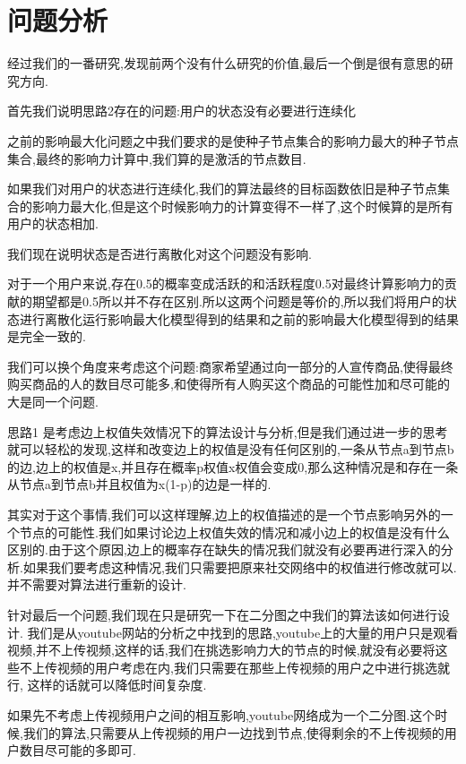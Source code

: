 \documentclass[11pt, a4paper]{article}
\begin{document}
  \section{问题分析}

  经过我们的一番研究,发现前两个没有什么研究的价值,最后一个倒是很有意思的研究方向.

  首先我们说明思路2存在的问题:用户的状态没有必要进行连续化

  之前的影响最大化问题之中我们要求的是使种子节点集合的影响力最大的种子节点集合,最终的影响力计算中,我们算的是激活的节点数目.

  如果我们对用户的状态进行连续化,我们的算法最终的目标函数依旧是种子节点集合的影响力最大化,但是这个时候影响力的计算变得不一样了,这个时候算的是所有用户的状态相加.

  我们现在说明状态是否进行离散化对这个问题没有影响.

  对于一个用户来说,存在0.5的概率变成活跃的和活跃程度0.5对最终计算影响力的贡献的期望都是0.5所以并不存在区别.所以这两个问题是等价的,所以我们将用户的状态进行离散化运行影响最大化模型得到的结果和之前的影响最大化模型得到的结果是完全一致的.

  我们可以换个角度来考虑这个问题:商家希望通过向一部分的人宣传商品,使得最终购买商品的人的数目尽可能多,和使得所有人购买这个商品的可能性加和尽可能的大是同一个问题.

  思路1 是考虑边上权值失效情况下的算法设计与分析,但是我们通过进一步的思考就可以轻松的发现,这样和改变边上的权值是没有任何区别的,一条从节点a到节点b的边,边上的权值是x,并且存在概率p权值x权值会变成0,那么这种情况是和存在一条从节点a到节点b并且权值为x(1-p)的边是一样的.

  其实对于这个事情,我们可以这样理解,边上的权值描述的是一个节点影响另外的一个节点的可能性.我们如果讨论边上权值失效的情况和减小边上的权值是没有什么区别的.由于这个原因,边上的概率存在缺失的情况我们就没有必要再进行深入的分析.如果我们要考虑这种情况,我们只需要把原来社交网络中的权值进行修改就可以.并不需要对算法进行重新的设计.

  针对最后一个问题,我们现在只是研究一下在二分图之中我们的算法该如何进行设计.
  我们是从youtube网站的分析之中找到的思路,youtube上的大量的用户只是观看视频,并不上传视频,这样的话,我们在挑选影响力大的节点的时候,就没有必要将这些不上传视频的用户考虑在内,我们只需要在那些上传视频的用户之中进行挑选就行, 这样的话就可以降低时间复杂度.

  如果先不考虑上传视频用户之间的相互影响,youtube网络成为一个二分图.这个时候,我们的算法,只需要从上传视频的用户一边找到节点,使得剩余的不上传视频的用户数目尽可能的多即可.
\end{document}
